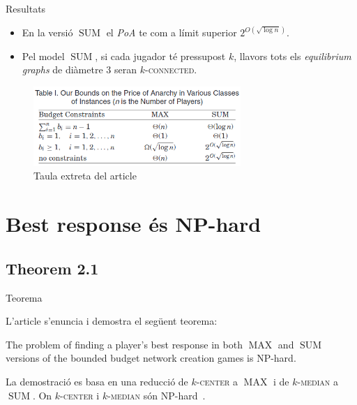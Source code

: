 \documentclass[aspectratio=169]{beamer}
\DeclareMathOperator{\SUM}{SUM}
\DeclareMathOperator{\MAX}{MAX}
\newcommand{\kcenter}{\texorpdfstring{$k$}{k}-\textsc{center}\xspace}
\newcommand{\kmedian}{\texorpdfstring{$k$}{k}-\textsc{median}\xspace}
\begin{document}
\begin{frame}{Resultats}
\begin{itemize}[<+->] 
    
    \item En la versió $\SUM$ el \emph{PoA} te com a límit superior $2^{O(\sqrt{\log n})}$.

    \vspace{1em}
    
    \item Pel model $\SUM$, si cada jugador té pressupost $k$, llavors tots els \emph{equilibrium graphs} de diàmetre $3$ seran $k$-\textsc{connected}.
    
\end{itemize} 

    \begin{figure}
    \centering
    \includegraphics[width=0.7\textwidth]{Table1_PoA_Bounds}
    \caption{Taula extreta del article \cite{ehsani_bounded_2015}}
    \end{figure}
\end{frame}

\section{Best response és NP-hard}
\subsection{Theorem 2.1}
\begin{frame}{Teorema}

    L'article s'enuncia i demostra el següent teorema:
    
    \begin{theorem}
    The problem of finding a player's best response in both $\MAX$ and $\SUM$ versions of the bounded
    budget network creation games is NP-hard.
    \end{theorem}
    
    \vspace{2em}
    
    La demostració es basa en una reducció de \kcenter a $\MAX$ i de \kmedian a $\SUM$.
    On \kcenter i \kmedian són 
    NP-hard~\cite{hsu_easy_1979,lin_e-approximations_1992,megiddo_complexity_1984}.
    
\end{frame}
\end{document}
